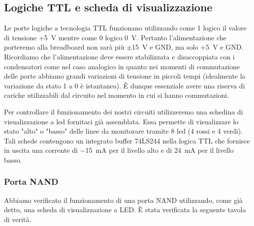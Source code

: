 \subsection{Logiche TTL e scheda di visualizzazione}
Le porte logiche a tecnologia TTL funzionano utilizzando come 1 logico il valore di tensione +\SI{5}{\volt} mentre come 0 logico \SI{0}{\volt}.
Pertanto l'alimentazione che porteremo alla breadboard non sarà più $\pm$\SI{15}{\V} e GND, ma solo $+$\SI{5}{\V} e GND.
Ricordiamo che l'alimentazione deve essere stabilizzata e disaccoppiata con i condensatori come nel caso analogico in quanto nei momenti di commutazione delle porte abbiamo grandi variazioni di tensione in piccoli tempi (idealmente la variazione da stato 1 a 0 è istantanea).
È dunque essenziale avere una riserva di cariche utilizzabili dal circuito nel momento in cui si hanno commutazioni.

Per controllare il funzionamento dei nostri circuiti utilizzeremo una schedina di visualizzazione a led fornitaci già assemblata.
Essa permette di visualizzare lo stato "alto" o "basso" delle linee da monitorare tramite 8 led (4 rossi e 4 verdi).
Tali schede contengono un integrato buffer 74LS244 nella logica TTL che fornisce in uscita una corrente di \SI{-15}{\milli\ampere} per il livello alto e di \SI{24}{\milli\ampere} per il livello basso.

\subsubsection{Porta NAND}


Abbiamo verificato il funzionamento di una porta NAND utilizzando, come già detto, una scheda di visualizzazione a LED.
È stata verificata la seguente tavola di verità.\\

